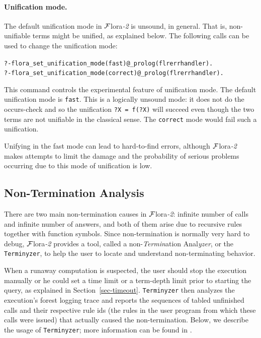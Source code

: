 \documentclass[11pt]{article}
\newcommand{\FLORA}{{\mbox{\sc ${\cal F}${lora}\rm\emph{-2}}}\xspace}
\begin{document}
\paragraph{Unification mode.} The default unification mode in \FLORA is
unsound, in general. That is, non-unifiable terms might be unified, as
explained below. The following calls can be used to change the unification
mode:
\begin{alltt}
    ?- flora_set_unification_mode(fast)@_prolog(flrerrhandler).
    ?- flora_set_unification_mode(correct)@_prolog(flrerrhandler).
\end{alltt}
This command controls the experimental feature of unification mode.
The default unification mode is \texttt{fast}. This is a logically unsound
mode: it does not do the occurs-check and so the unification
\texttt{?X = f(?X)} will succeed even though the two terms are not
unifiable in the classical sense. The \texttt{correct} mode would fail such a
unification.

Unifying in the fast mode can lead to hard-to-find errors, although \FLORA
makes attempts to limit the damage and the probability of serious problems
occurring due to this mode of unification is low.

\subsection{Non-Termination Analysis}\label{sec-terminyzer}


There are two main non-termination causes in \FLORA: infinite number of
calls and infinite number of answers, and both of them arise due to
recursive rules together with function symbols. 
Since non-termination is normally very hard to debug, \FLORA provides 
a tool, called a
non-\emph{Termin}ation Anal\emph{yzer}, or the
\texttt{Terminyzer}, to help the user to locate and understand
non-terminating behavior. 

When a runaway computation is suspected, the user should stop the execution
manually or he could set a 
time limit or a term-depth limit prior to starting the query, as explained
in Section~\ref{sec-timeout}.
\texttt{Terminyzer} then analyzes the execution's forest logging trace
and reports the sequences of tabled unfinished calls and their
respective rule ids (the rules in the user program from which these
calls were issued) that actually caused the non-termination.
Below, we describe the usage of \texttt{Terminyzer}; more
information can be found in \cite{terminyzer}.
\end{document}
